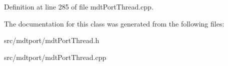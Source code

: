Definition at line 285 of file mdtPortThread.cpp.



The documentation for this class was generated from the following files:\begin{DoxyCompactItemize}
\item 
src/mdtport/mdtPortThread.h\item 
src/mdtport/mdtPortThread.cpp\end{DoxyCompactItemize}
